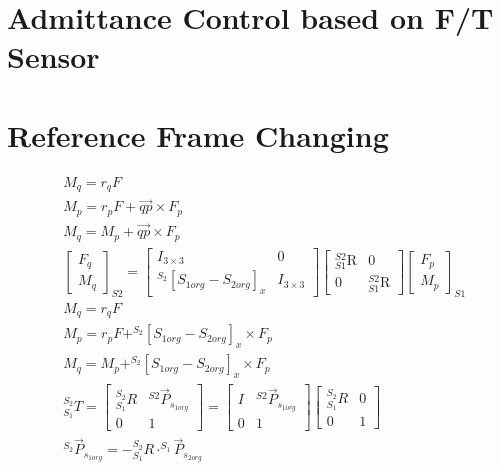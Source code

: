 \documentclass[12pt]{article}
\begin{document}
\begin{CJK}{UTF8}{bsmi}
\section{Admittance Control based on F/T Sensor}
\section{Reference Frame Changing}
\begin{equation*}
\begin{split}
&M_q = r_qF\\
&M_p = r_pF+\overrightarrow{qp}\times F_p\\
&M_q = M_p + \vec{qp} \times F_p\\
&\begin{bmatrix}
F_q\\ 
M_q
\end{bmatrix}
_{S2}
=
\begin{bmatrix}
I_{3 \times 3} & 0\\ 
^{S_2}[S_{1org}-S_{2org}]_x & I_{3 \times 3}
\end{bmatrix}
\begin{bmatrix}
_{S1}^{S2}\textrm{R} & 0\\ 
0 & _{S1}^{S2}\textrm{R}
\end{bmatrix}
\begin{bmatrix}
F_p\\ 
M_p
\end{bmatrix}
_{S1}\\
&M_q = r_qF\\
&M_p = r_pF+ ^{S_2}[S_{1org}-S_{2org}]_x\times F_p\\
&M_q = M_p + ^{S_2}[S_{1org}-S_{2org}]_x \times F_p\\
&^{S_2}_{S_1}T = 
\begin{bmatrix}
^{S_2}_{S_1}R   & ^{S2}\vec{P}_{s_{1 org} }\\ 
0               & 1
\end{bmatrix}
=
\begin{bmatrix}
I & ^{S2}\vec{P}_{s_{1 org} }\\ 
0 & 1
\end{bmatrix}
\begin{bmatrix}
^{S_2}_{S_1}R & 0\\ 
0 & 1
\end{bmatrix}\\
&^{S_2}\vec{P}_{s_{1 org} } = -^{S_2}_{S_1}R \cdot ^{S_1}\vec{P}_{s_{2 org}}\\
\end{split}
\end{equation*}



\end{CJK}
\end{document}
